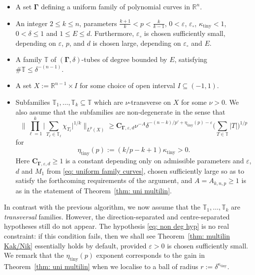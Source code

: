 \documentclass[reqno]{amsart}
\numberwithin{equation}{section}
\newcommand{\R}{\mathbb{R}}
\newcommand{\T}{\mathbb{T}}
\newcommand{\bC}{\mathbf{C}}
\newcommand{\bdGamma}{\boldsymbol{\Gamma}}
\theoremstyle{plain}
\theoremstyle{definition}
\newcommand{\ttiny}{\mathrm{tiny}}
\begin{document}
\begin{itemize}
    \item A set $\bdGamma$ defining a uniform family of polynomial curves in $\R^n$.
     \item An integer $2 \leq k \leq n$, parameters $\frac{k+1}{k} < p < \frac{k}{k-1}$, $0 < \varepsilon$, $\varepsilon_{\circ}$,  $\kappa_{\ttiny} < 1$, $0 < \delta \leq  1$ and $1 \leq E \leq d$. Furthermore, $\varepsilon_{\circ}$ is chosen sufficiently small, depending on $\varepsilon$, $p$, and $d$ is chosen large, depending on $\varepsilon_{\circ}$ and $E$.
    \item A family $\T$ of $(\bdGamma, \delta)$-tubes of degree bounded by $E$, satisfying $\#\T \leq \delta^{-(n-1)}$. 
     \item  A set $X := \R^{n-1} \times I$ for some choice of open interval $I \subseteq (-1,1)$.
  
    \item Subfamilies $\T_1, \dots, \T_k \subseteq \T$ which are $\nu$-transverse on $X$ for some $\nu > 0$. We also assume that the subfamilies are non-degenerate in the sense that
\begin{equation}\label{eq: non deg hyp}
\Big\|\prod_{\ell = 1}^k \big|\sum_{T_{\ell} \in \T_{\ell}} \chi_{T_{\ell}} \big|^{1/k}\Big\|_{L^p(X)} \geq \bC_{\bdGamma, \varepsilon, d} \nu^{-A} \delta^{-(n-k)/p' + \eta_{\ttiny}(p) - \varepsilon}  \Big(\sum_{T \in \T}|T|\Big)^{1/p}
\end{equation}
for
\begin{equation}\label{eq: delta exp}
   \eta_{\ttiny}(p) := (k/p - k + 1)\kappa_{\ttiny} > 0.
\end{equation}
Here $\bC_{\bdGamma, \varepsilon, d} \geq 1$ is a constant depending only on admissible parameters and $\varepsilon$, $d$ and $M_1$ from \eqref{eq: uniform family curves}, chosen sufficiently large so as to satisfy the forthcoming requirements of the argument, and $A = A_{k,n,p} \geq 1$ is as in the statement of Theorem~\ref{thm: uni multilin}.
\end{itemize}

In contrast with the previous algorithm, we now assume that the $\T_1, \dots, \T_k$ are \textit{transversal} families. However, the direction-separated and centre-separated hypotheses still do not appear. The hypothesis \eqref{eq: non deg hyp} is no real constraint: if this condition fails, then we shall see Theorem~\ref{thm: multilin Kak/Nik} essentially holds by default, provided $\varepsilon >0$ is chosen sufficiently small. We remark that the $\eta_{\ttiny}(p)$ exponent corresponds to the gain in Theorem~\ref{thm: uni multilin} when we localise to a ball of radius $r := \delta^{\kappa_{\ttiny}}$. \medskip
\end{document}
